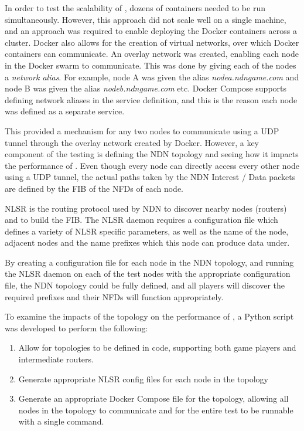 In order to test the scalability of \game{}, dozens of containers needed to be run simultaneously. However, this approach did not scale well on a single machine, and an approach was required to enable deploying the Docker containers across a cluster. Docker also allows for the creation of virtual networks, over which Docker containers can communicate. An overlay network was created, enabling each node in the Docker swarm to communicate. This was done by giving each of the nodes a \textit{network alias}. For example, node A was given the alias \textit{nodea.ndngame.com} and node B was given the alias \textit{nodeb.ndngame.com} etc. Docker Compose supports defining network aliases in the service definition, and this is the reason each node was defined as a separate service.

This provided a mechanism for any two nodes to communicate using a UDP tunnel through the overlay network created by Docker. However, a key component of the testing is defining the NDN topology and seeing how it impacts the performance of \game{}. Even though every node can directly access every other node using a UDP tunnel, the actual paths taken by the NDN Interest / Data packets are defined by the FIB of the NFDs of each node. 

NLSR \cite{nlsr} is the routing protocol used by NDN to discover nearby nodes (routers) and to build the FIB. The NLSR daemon requires a configuration file which defines a variety of NLSR specific parameters, as well as the name of the node, adjacent nodes and the name prefixes which this node can produce data under. 

By creating a configuration file for each node in the NDN topology, and running the NLSR daemon on each of the test nodes with the appropriate configuration file, the NDN topology could be fully defined, and all players will discover the required prefixes and their NFDs will function appropriately.

To examine the impacts of the topology on the performance of \game{}, a Python script was developed to perform the following:

\begin{enumerate}
    \item Allow for topologies to be defined in code, supporting both game players and intermediate routers.
    \item Generate appropriate NLSR config files for each node in the topology
    \item Generate an appropriate Docker Compose file for the topology, allowing all nodes in the topology to communicate and for the entire test to be runnable with a single command.
\end{enumerate}

